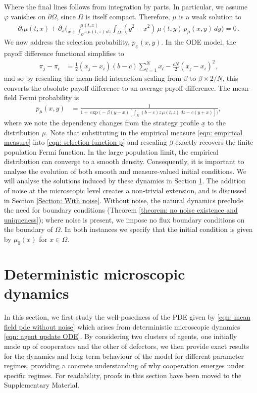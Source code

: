 \documentclass[10pt]{article}
\begin{document}
Where the final lines follows from integration by parts. In particular, we assume $\varphi$ vanishes on $\partial\Omega$, since $\Omega$ is itself compact. Therefore, $\mu$ is a weak solution to
\begin{align}\label{eqn: mean field pde without noise}
    \partial_t\mu(t,x) +\partial_x\Bigg( \frac{\mu(t,x)}{x+\int_{\Omega} z\,\mu(t,z)\,dz} \int_{\Omega} (y^2-x^2)\,\mu(t,y)\,p_\mu(x,y)\,dy\Bigg) = 0 \,.
\end{align}
We now address the selection probability, $p_{\underline{x}}(x,y)$. In the ODE model, the payoff difference functional simplifies to
\begin{align*}
    \pi_j - \pi_i &= \frac{1}{2}(x_j-x_i)(b-c)\sum_{l=1}^Nx_l - \frac{cN}{2}(x_j-x_i)^2, 
\end{align*}
and so by rescaling the mean-field interaction scaling from $\beta$ to $\beta \times 2/N$, this converts the absolute payoff difference to an average payoff difference. The mean-field Fermi probability is 
\begin{align}\label{eqn: selection function p}
    p_\mu(x,y) &= \frac{1}{1+\exp\big(-\beta(y-x)[\int_\Omega (b-c)z\,\mu(t,z)\,dz - c(y+x)]\big)},
\end{align}
where we note the dependency changes from the strategy profile $\underline{x}$ to the distribution $\mu$. Note that substituting in the empirical measure \eqref{eqn: empirical measure} into \eqref{eqn: selection function p} and rescaling $\beta$ exactly recovers the finite population Fermi function. In the large population limit, the empirical distribution can converge to a smooth density. Consequently, it is important to analyse the evolution of both smooth and measure-valued initial conditions. We will analyse the solutions induced by these dynamics in Section \ref{Section: No noise}. The addition of noise at the microscopic level creates a non-trivial extension, and is discussed in Section \ref{Section: With noise}. Without noise, the natural dynamics preclude the need for boundary conditions (Theorem \ref{theorem: no noise existence and uniqueness}); where noise is present, we impose no flux boundary conditions on the boundary of $\Omega$. In both instances we specify that the initial condition is given by $\mu_0(x)$ for $x \in \Omega$.

\section{Deterministic microscopic dynamics} \label{Section: No noise}
In this section, we first study the well-posedness of the PDE given by \eqref{eqn: mean field pde without noise} which arises from deterministic microscopic dynamics \eqref{eqn: agent update ODE}. By considering two clusters of agents, one initially made up of cooperators and the other of defectors, we then provide exact results for the dynamics and long term behaviour of the model for different parameter regimes, providing a concrete understanding of why cooperation emerges under specific regimes. For readability, proofs in this section have been moved to the Supplementary Material.
\end{document}
